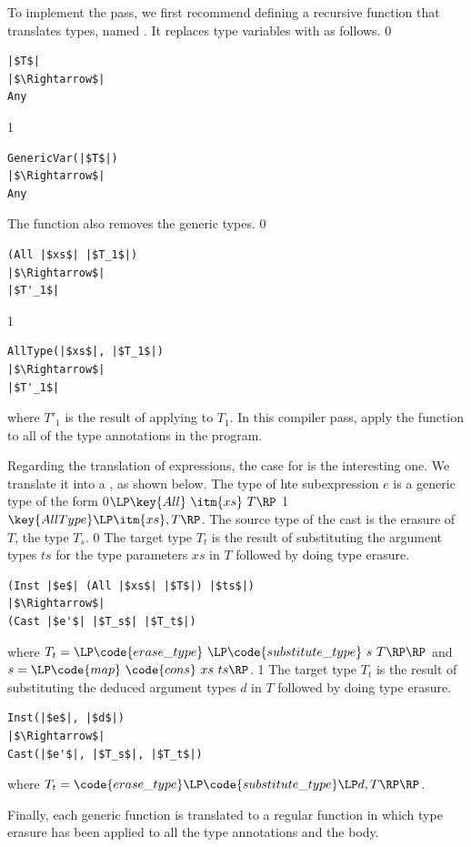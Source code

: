 \documentclass[7x10]{TimesAPriori_MIT}%
\def\racketEd{0}
\def\pythonEd{1}
\def\edition{0}
\newcommand{\racket}[1]{{\if\edition\racketEd{#1}\fi}}
\newcommand{\python}[1]{{\if\edition\pythonEd #1\fi}}
\numberwithin{theorem}{chapter}
\numberwithin{definition}{chapter}
\numberwithin{equation}{chapter}
\begin{document}
To implement the  pass, we first recommend defining
a recursive function that translates types, named
. It replaces type variables with \CANYTY{} as
follows.
%
\if\edition\racketEd
\begin{lstlisting}
|$T$|
|$\Rightarrow$|
Any
\end{lstlisting}
\fi
\if\edition\pythonEd
\begin{lstlisting}
GenericVar(|$T$|)
|$\Rightarrow$|
Any
\end{lstlisting}
\fi
%
\noindent The  function also removes the generic
 types.
%
\if\edition\racketEd
\begin{lstlisting}
(All |$xs$| |$T_1$|)
|$\Rightarrow$|
|$T'_1$|
\end{lstlisting}
\fi
\if\edition\pythonEd
\begin{lstlisting}
AllType(|$xs$|, |$T_1$|)
|$\Rightarrow$|
|$T'_1$|
\end{lstlisting}
\fi
where $T'_1$ is the result of applying  to $T_1$.
%
In this compiler pass, apply the  function to all of
the type annotations in the program.

Regarding the translation of expressions, the case for  is
the interesting one. We translate it into a , as shown
below.
The type of hte subexpression $e$ is a generic type of the form
\racket{$\LP\key{All}~\itm{xs}~T\RP$}
\python{$\key{AllType}\LP\itm{xs}, T\RP$}.  The source type of the
cast is the erasure of $T$, the type $T_s$.
%
\if\edition\racketEd
%
The target type $T_t$ is the result of substituting the argument types
$ts$ for the type parameters $xs$ in $T$ followed by doing type
erasure.
%
\begin{lstlisting}
(Inst |$e$| (All |$xs$| |$T$|) |$ts$|)
|$\Rightarrow$|
(Cast |$e'$| |$T_s$| |$T_t$|)
\end{lstlisting}
%
where $T_t = \LP\code{erase\_type}~\LP\code{substitute\_type}~s~T\RP\RP$
and $s = \LP\code{map}~\code{cons}~xs~ts\RP$.
\fi
\if\edition\pythonEd
%
The target type $T_t$ is the result of substituting the deduced
argument types $d$ in $T$ followed by doing type erasure.
%
\begin{lstlisting}
Inst(|$e$|, |$d$|)
|$\Rightarrow$|
Cast(|$e'$|, |$T_s$|, |$T_t$|)
\end{lstlisting}
%
where
$T_t = \code{erase\_type}\LP\code{substitute\_type}\LP d, T\RP\RP$.
\fi

Finally, each generic function is translated to a regular
function in which type erasure has been applied to all the type
annotations and the body.
\end{document}
